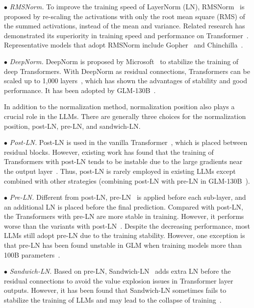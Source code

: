 {{{
    $\bullet$ \emph{RMSNorm.} To improve the training speed of LayerNorm (LN), RMSNorm~\cite{Zhang-NIPS-2019-Root} is proposed by re-scaling the activations with only the root mean square (RMS) of the summed activations,  instead of the mean and variance. Related research has demonstrated its superiority in training speed and performance on Transformer~\cite{Narang-EMNLP-2021-Do}. Representative models that adopt RMSNorm include Gopher~\cite{Rae-arxiv-2021-Scaling} and Chinchilla~\cite{Hoffmann-arxiv-2022-Training}.}

{
    $\bullet$ \emph{DeepNorm.} DeepNorm is proposed by Microsoft~\cite{Wang-arxiv-2022-DeepNet} to stabilize the training of deep Transformers. 
    With DeepNorm as residual connections, Transformers can be scaled up to 1,000 layers~\cite{Wang-arxiv-2022-DeepNet}, which has shown  the advantages of stability and good performance. It has been adopted by GLM-130B~\cite{Zeng-arxiv-2022-GLM}.
    }
    
 {In addition to the normalization method, normalization position also plays a  crucial role in the LLMs. There are generally three choices for the normalization position, \ie post-LN, pre-LN, and sandwich-LN. } 

{
    $\bullet$ \emph{Post-LN.} Post-LN is used in the vanilla  Transformer~\cite{Vaswani-NIPS-2017-Attention}, which is placed between residual blocks. However, existing work has found that the training of Transformers with post-LN tends  to be  instable due to the large gradients near the output layer~\cite{Xiong-ICML-2020-On}. Thus, post-LN is rarely employed in existing LLMs except combined with other strategies (\eg combining post-LN with pre-LN in GLM-130B~\cite{Zeng-arxiv-2022-GLM}).  }


{
    $\bullet$ \emph{Pre-LN.} Different from post-LN, pre-LN~\cite{Baevski-2019-ICLR-Adaptive} is applied before each sub-layer, and an additional LN is placed before the final prediction. Compared with post-LN, the Transformers with pre-LN are more stable in training. However, it performs worse than the variants with post-LN~\cite{liu-2020-EMNLP-Understanding}. Despite the decreasing performance, most LLMs still adopt pre-LN due to the training stability. } 
    {
    However, one exception is that pre-LN  has been found   unstable in GLM when training models more than 100B parameters~\cite{Zeng-arxiv-2022-GLM}.
    }


    $\bullet$ \emph{Sandwich-LN.} Based on pre-LN, Sandwich-LN~\cite{Ding-NIPS-2021-CogView} adds extra LN before the residual connections to avoid the  {value explosion issues in Transformer layer outputs.} However, it has been found that Sandwich-LN sometimes fails to stabilize the training of LLMs and may lead to the collapse of training~\cite{Zeng-arxiv-2022-GLM}.
    


}}
